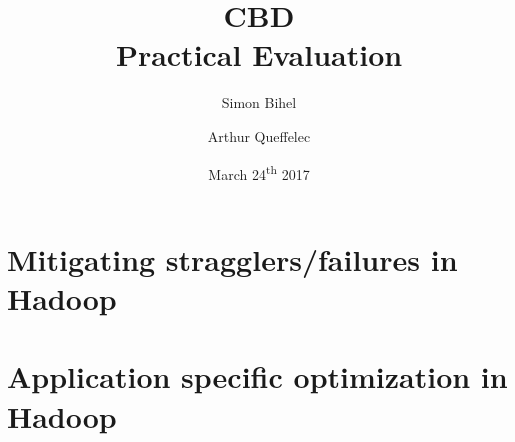 \documentclass{article}
\title{CBD\\Practical Evaluation}
\author{Simon Bihel \and Arthur Queffelec}
\date{March 24\textsuperscript{th} 2017}
\begin{document}
\maketitle

\section{Mitigating stragglers/failures in Hadoop}

\cprotEnv\begin{question}
\end{question}

\cprotEnv\begin{question}
\end{question}


\section{Application specific optimization in Hadoop}

\cprotEnv\begin{question}
\end{question}
\end{document}
